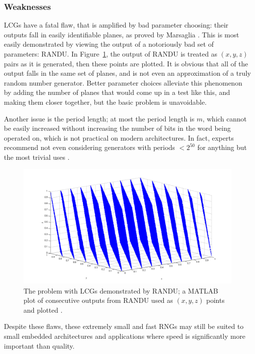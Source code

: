 \subsubsection{Weaknesses}

LCGs have a fatal flaw, that is amplified by bad parameter choosing: their outputs fall in easily identifiable planes, as proved by Marsaglia \cite{randomnumbersinplanes}. This is most easily demonstrated by viewing the output of a notoriously bad set of parameters: RANDU. In Figure~\ref{fig:randu_fig}, the output of RANDU is treated as $(x,y,z)$ pairs as it is generated, then these points are plotted. It is obvious that all of the output falls in the same set of planes, and is not even an approximation of a truly random number generator. Better parameter choices alleviate this phenomenon by adding the number of planes that would come up in a test like this, and making them closer together, but the basic problem is unavoidable.

Another issue is the period length; at most the period length is $m$, which cannot be easily increased without increasing the number of bits in the word being operated on, which is not practical on modern architectures. In fact, experts recommend not even considering generators with periods $<2^{50}$ for anything but the most trivial uses \cite{L'Ecuyer:1992:TRN:167293.167354}.

\begin{figure}[tb]
    \begin{center}
        \includegraphics[width=\linewidth]{figures/randu.png}
    \end{center}
    \caption{The problem with LCGs demonstrated by RANDU; a MATLAB plot of consecutive outputs from RANDU used as $(x,y,z)$ points and plotted \cite{randu_fig}.}
    \label{fig:randu_fig}
\end{figure}

Despite these flaws, these extremely small and fast RNGs may still be suited to small embedded architectures and applications where speed is significantly more important than quality.
